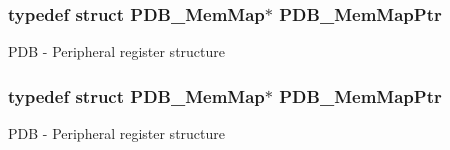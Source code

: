 \subsubsection[{\texorpdfstring{P\+D\+B\+\_\+\+Mem\+Map\+Ptr}{PDB_MemMapPtr}}]{\setlength{\rightskip}{0pt plus 5cm}typedef struct {\bf P\+D\+B\+\_\+\+Mem\+Map}$\ast$ {\bf P\+D\+B\+\_\+\+Mem\+Map\+Ptr}}\hypertarget{group___p_d_b___peripheral_ga99a192ea14b33afb792a0de304e131be}{}\label{group___p_d_b___peripheral_ga99a192ea14b33afb792a0de304e131be}
P\+DB -\/ Peripheral register structure 
\subsubsection[{\texorpdfstring{P\+D\+B\+\_\+\+Mem\+Map\+Ptr}{PDB_MemMapPtr}}]{\setlength{\rightskip}{0pt plus 5cm}typedef struct {\bf P\+D\+B\+\_\+\+Mem\+Map}$\ast$ {\bf P\+D\+B\+\_\+\+Mem\+Map\+Ptr}}\hypertarget{group___p_d_b___peripheral_ga99a192ea14b33afb792a0de304e131be}{}\label{group___p_d_b___peripheral_ga99a192ea14b33afb792a0de304e131be}
P\+DB -\/ Peripheral register structure 